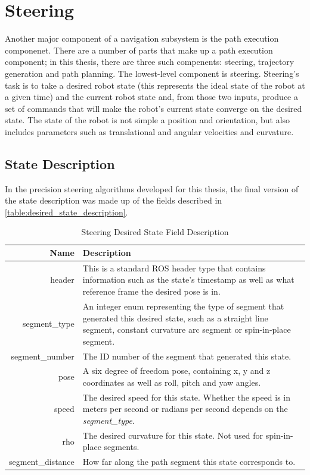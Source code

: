 \section{Steering}\label{sec:steering}

Another major component of a navigation subsystem is the path execution componenet. There are a number of parts that make up a path execution component; in this thesis, there are three such compenents: steering, trajectory generation and path planning. The lowest-level component is steering. Steering's task is to take a desired robot state (this represents the ideal state of the robot at a given time) and the current robot state and, from those two inputs, produce a set of commands that will make the robot's current state converge on the desired state. The state of the robot is not simple a position and orientation, but also includes parameters such as translational and angular velocities and curvature.

\subsection{State Description}\label{subsec:steering_state}

In the precision steering algorithms developed for this thesis, the final version of the state description was made up of the fields described in \autoref{table:desired_state_description}.

\begin{table}[htbp]
	\begin{tabularx}{\textwidth}{|r|X|}
		\hline
		Name & Description \\
		\hline
		header & This is a standard ROS header type that contains information such as the state's timestamp as well as what reference frame the desired pose is in. \\
		\hline
		segment\_type & An integer enum representing the type of segment that generated this desired state, such as a straight line segment, constant curvature arc segment or spin-in-place segment. \\
		\hline
		segment\_number & The ID number of the segment that generated this state. \\
		\hline
		pose & A six degree of freedom pose, containing x, y and z coordinates as well as roll, pitch and yaw angles. \\
		\hline
		speed & The desired speed for this state. Whether the speed is in meters per second or radians per second depends on the \emph{segment\_type}. \\
		\hline
		rho & The desired curvature for this state. Not used for spin-in-place segments. \\
		\hline
		segment\_distance & How far along the path segment this state corresponds to. \\
		\hline
	\end{tabularx}
	\caption{Steering Desired State Field Description \label{table:desired_state_description}}
\end{table}

